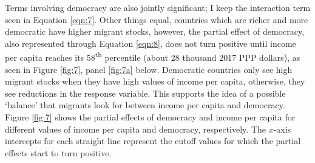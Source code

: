 \documentclass[../main.tex]{subfiles}
\begin{document}
Terms involving democracy are also jointly significant; I keep the interaction term seen in Equation \ref{eqn:7}. Other things equal, countries which are richer and more democratic have higher migrant stocks, however, the partial effect of democracy, also represented through Equation \ref{eqn:8}, does not turn positive until income per capita reaches its 58\textsuperscript{th} percentile (about 28 thousand 2017 PPP dollars), as seen in Figure \ref{fig:7}, panel \ref{fig:7a} below. Democratic countries only see high migrant stocks when they have high values of income per capita, otherwise, they see reductions in the response variable. This supports the idea of a possible `balance' that migrants look for between income per capita and democracy. Figure \ref{fig:7} shows the partial effects of democracy and income per capita for different values of income per capita and democracy, respectively. The $x$-axis intercepts for each straight line represent the cutoff values for which the partial effects start to turn positive.
\end{document}
